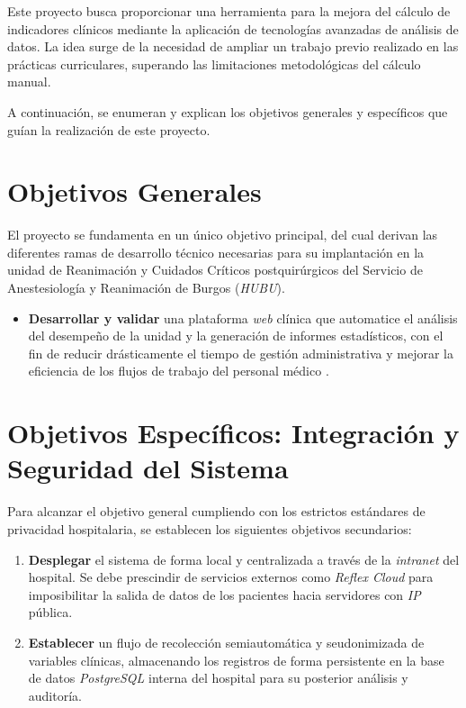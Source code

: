  \label{ch:objetivos}
Este proyecto busca proporcionar una herramienta para la mejora del cálculo de indicadores clínicos mediante la aplicación de tecnologías avanzadas de análisis de datos. La idea surge de la necesidad de ampliar un trabajo previo realizado en las prácticas curriculares, superando las limitaciones metodológicas del cálculo manual.

A continuación, se enumeran y explican los objetivos generales y específicos que guían la realización de este proyecto.

\section{Objetivos Generales}
El proyecto se fundamenta en un único objetivo principal, del cual derivan las diferentes ramas de desarrollo técnico necesarias para su implantación en la unidad de Reanimación y Cuidados Críticos postquirúrgicos del Servicio de Anestesiología y Reanimación de Burgos (\textit{HUBU}).

\begin{itemize}
    \item \textbf{Desarrollar y validar} una plataforma \textit{web} clínica que automatice el análisis del desempeño de la unidad y la generación de informes estadísticos, con el fin de reducir drásticamente el tiempo de gestión administrativa y mejorar la eficiencia de los flujos de trabajo del personal médico \cite{semicyuc}.
\end{itemize}

\section{Objetivos Específicos: Integración y Seguridad del Sistema}
Para alcanzar el objetivo general cumpliendo con los estrictos estándares de privacidad hospitalaria, se establecen los siguientes objetivos secundarios:

\begin{enumerate}
    \item \textbf{Desplegar} el sistema de forma local y centralizada a través de la \textit{intranet} del hospital. Se debe prescindir de servicios externos como \textit{Reflex Cloud} para imposibilitar la salida de datos de los pacientes hacia servidores con \textit{IP} pública.
    \item \textbf{Establecer} un flujo de recolección semiautomática y seudonimizada de variables clínicas, almacenando los registros de forma persistente en la base de datos \textit{PostgreSQL} interna del hospital para su posterior análisis y auditoría.
\end{enumerate}


